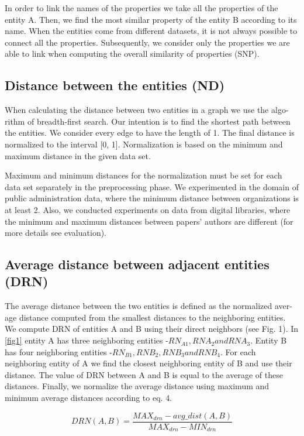 \documentclass{llncs}
\begin{document}
In order to link the names of the properties we take all the properties of the
entity A. Then, we find the most similar property of the entity B according to its
name. When the entities come from different datasets, it is not always possible
to connect all the properties. Subsequently, we consider only the properties we
are able to link when computing the overall similarity of properties (SNP).

\subsection {Distance between the entities (ND)}
When calculating the distance between two entities in a graph we use the algo-
rithm of breadth-first search. Our intention is to find the shortest path between
the entities. We consider every edge to have the length of 1. The final distance
is normalized to the interval [0, 1]. Normalization is based on the minimum and
maximum distance in the given data set.

Maximum and minimum distances for the normalization must be set for each
data set separately in the preprocessing phase. We experimented in the domain of
public administration data, where the minimum distance between organizations
is at least 2. Also, we conducted experiments on data from digital libraries, where
the minimum and maximum distances between papers' authors are different (for
more details see evaluation).

\subsection {Average distance between adjacent entities (DRN)}
The average distance between the two entities is defined as the normalized aver-
age distance computed from the smallest distances to the neighboring entities.
We compute DRN of entities A and B using their direct neighbors (see Fig. 1).
In \ref{fig1} entity A has three neighboring entities -$ RN_{A1}, RNA_2 and RNA_3.$
Entity B has four neighboring entities -$ RN_{B1}, RNB_2, RNB_3 and RNB_4.$ For
each neighboring entity of A we find the closest neighboring entity of B and use
their distance. The value of DRN between A and B is equal to the average of
these distances. Finally, we normalize the average distance using maximum and
minimum average distances according to eq. 4.

\begin {equation}
DRN(A,B)=\frac{MAX_{drn}-avg\_dist(A, B)}{MAX_{drn}-MIN_{drn}}
\label{rov4}
\end{equation}
\end{document}
